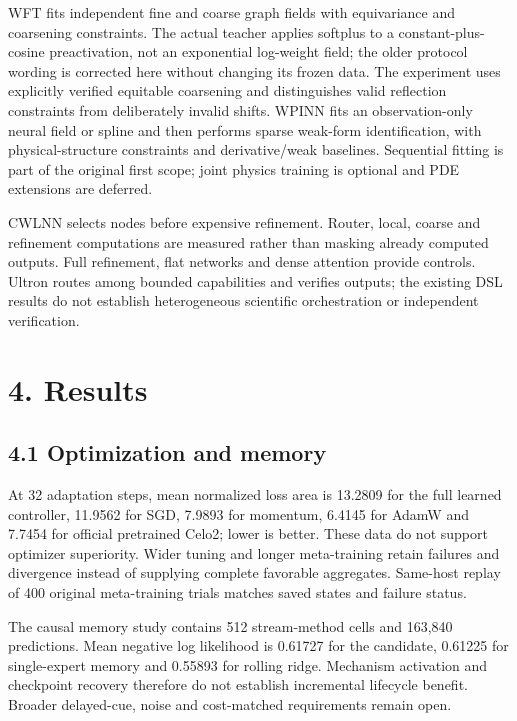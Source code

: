 \documentclass[
  11pt,
  a4paper,
]{article}
\begin{document}
WFT fits independent fine and coarse graph fields with equivariance and
coarsening constraints. The actual teacher applies softplus to a
constant-plus-cosine preactivation, not an exponential log-weight field;
the older protocol wording is corrected here without changing its frozen
data. The experiment uses explicitly verified equitable coarsening and
distinguishes valid reflection constraints from deliberately invalid
shifts. WPINN fits an observation-only neural field or spline and then
performs sparse weak-form identification, with physical-structure
constraints and derivative/weak baselines. Sequential fitting is part of
the original first scope; joint physics training is optional and PDE
extensions are deferred.

CWLNN selects nodes before expensive refinement. Router, local, coarse
and refinement computations are measured rather than masking already
computed outputs. Full refinement, flat networks and dense attention
provide controls. Ultron routes among bounded capabilities and verifies
outputs; the existing DSL results do not establish heterogeneous
scientific orchestration or independent verification.

\section{4. Results}\label{results}

\subsection{4.1 Optimization and memory}\label{optimization-and-memory}

At 32 adaptation steps, mean normalized loss area is 13.2809 for the
full learned controller, 11.9562 for SGD, 7.9893 for momentum, 6.4145
for AdamW and 7.7454 for official pretrained Celo2; lower is better.
These data do not support optimizer superiority. Wider tuning and longer
meta-training retain failures and divergence instead of supplying
complete favorable aggregates. Same-host replay of 400 original
meta-training trials matches saved states and failure status.

The causal memory study contains 512 stream-method cells and 163,840
predictions. Mean negative log likelihood is 0.61727 for the candidate,
0.61225 for single-expert memory and 0.55893 for rolling ridge.
Mechanism activation and checkpoint recovery therefore do not establish
incremental lifecycle benefit. Broader delayed-cue, noise and
cost-matched requirements remain open.
\end{document}
